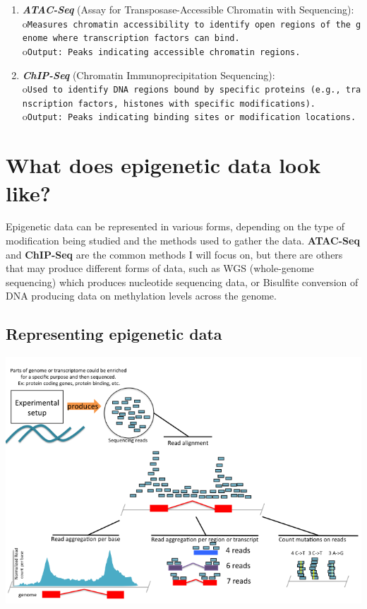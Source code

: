 \documentclass[
]{book}
\begin{document}
\begin{enumerate}
\def\labelenumi{\arabic{enumi}.}
\item
  \textbf{\emph{ATAC-Seq}} (Assay for Transposase-Accessible Chromatin with Sequencing):
  o\texttt{Measures\ chromatin\ accessibility\ to\ identify\ open\ regions\ of\ the\ genome\ where\ transcription\ factors\ can\ bind.}
  o\texttt{Output:\ Peaks\ indicating\ accessible\ chromatin\ regions.}
\item
  \textbf{\emph{ChIP-Seq}} (Chromatin Immunoprecipitation Sequencing):
  o\texttt{Used\ to\ identify\ DNA\ regions\ bound\ by\ specific\ proteins\ (e.g.,\ transcription\ factors,\ histones\ with\ specific\ modifications).}
  o\texttt{Output:\ Peaks\ indicating\ binding\ sites\ or\ modification\ locations.}
\end{enumerate}

\section{What does epigenetic data look like?}\label{what-does-epigenetic-data-look-like}

Epigenetic data can be represented in various forms, depending on the type of modification being studied and the methods used to gather the data. \textbf{ATAC-Seq} and \textbf{ChIP-Seq} are the common methods I will focus on, but there are others that may produce different forms of data, such as WGS (whole-genome sequencing) which produces nucleotide sequencing data, or Bisulfite conversion of DNA producing data on methylation levels across the genome.

\subsection{Representing epigenetic data}\label{representing-epigenetic-data}

\includegraphics{images/sequencing_pipeline.png}
\end{document}
